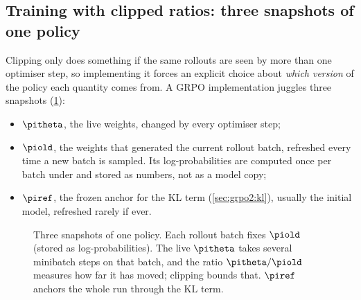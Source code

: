 \subsection{Training with clipped ratios: three snapshots of one policy}\label{sec:grpo2:clipstrain}

Clipping only does something if the same rollouts are seen by more than one optimiser step,
so implementing it forces an explicit choice about \emph{which version} of the policy each
quantity comes from. A GRPO implementation juggles three snapshots (\cref{fig:grpo2:snapshots}):
\begin{itemize}
\item $\pitheta$, the live weights, changed by every optimiser step;
\item $\piold$, the weights that generated the current rollout batch, refreshed every time a
new batch is sampled. Its log-probabilities are computed once per batch under 
and stored as numbers, not as a model copy;
\item $\piref$, the frozen anchor for the KL term (\cref{sec:grpo2:kl}), usually the
initial model, refreshed rarely if ever.
\end{itemize}

\begin{figure}[ht]
\centering
{}
\caption{Three snapshots of one policy. Each rollout batch fixes $\piold$ (stored as
log-probabilities). The live $\pitheta$ takes several minibatch steps on that batch, and the
ratio $\pitheta/\piold$ measures how far it has moved; clipping bounds that. $\piref$
anchors the whole run through the KL term.}
\label{fig:grpo2:snapshots}
\end{figure}

